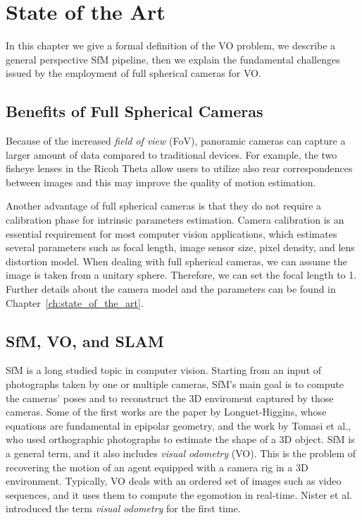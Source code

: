 \chapter{State of the Art}
\label{ch:state_of_the_art}
In this chapter we give a formal definition of the VO problem, we describe a 
general perspective SfM pipeline, then 
we explain the fundamental challenges issued by the employment of full 
spherical cameras for VO.
%
%
\section{Benefits of Full Spherical Cameras}
Because of the increased \textit{field of view} (FoV), panoramic cameras can capture a larger amount of data compared to traditional devices. For example, the two fisheye lenses in the Ricoh Theta allow users to utilize also rear correspondences between images and this may improve the quality of motion estimation.

Another advantage of full spherical cameras is that they do not require a calibration phase for intrinsic parameters estimation. Camera calibration is an essential requirement for most computer vision applications, which estimates several parameters such as focal length, image 
sensor size, pixel density, and lens distortion model. When dealing with full spherical cameras, we can assume the image is taken from a unitary sphere. Therefore, we can set the focal length to 1. Further details about the camera model and the parameters can be found in Chapter~\ref{ch:state_of_the_art}.

\section{SfM, VO, and SLAM}
SfM is a long studied topic in computer vision. Starting from an input of photographs taken by one or multiple cameras, SfM's main goal is to compute the cameras' poses and to reconstruct the 3D enviroment captured by those cameras.
%
Some of the first works are the paper by Longuet-Higgins\cite{longuet1981computer}, whose equations are fundamental in epipolar geometry, and the work by Tomasi et al.\cite{tomasi1992shape}, who used orthographic photographs to estimate the shape of a 3D object.
%
SfM is a general term, and it also includes \textit{visual odometry} (VO). This is the problem of recovering the motion of an agent equipped with a camera rig in a 3D environment. Typically, VO deals with an ordered set of images such as video sequences, and it uses them to compute the egomotion in real-time. Nister et al.\cite{nister2004visual} introduced the term \textit{visual odometry} for the first time.

